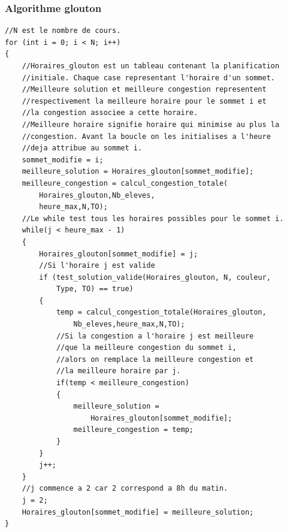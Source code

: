 \documentclass[a4paper,11pt]{article}
\begin{document}
		\subsubsection{Algorithme glouton}
\begin{lstlisting}
//N est le nombre de cours.
for (int i = 0; i < N; i++)
{
	//Horaires_glouton est un tableau contenant la planification 
	//initiale. Chaque case representant l'horaire d'un sommet.
	//Meilleure solution et meilleure congestion representent 
	//respectivement la meilleure horaire pour le sommet i et 
	//la congestion associee a cette horaire.
	//Meilleure horaire signifie horaire qui minimise au plus la 
	//congestion. Avant la boucle on les initialises a l'heure 
	//deja attribue au sommet i.
	sommet_modifie = i;
	meilleure_solution = Horaires_glouton[sommet_modifie];
	meilleure_congestion = calcul_congestion_totale(
		Horaires_glouton,Nb_eleves,
		heure_max,N,TO);
	//Le while test tous les horaires possibles pour le sommet i.
	while(j < heure_max - 1)
	{
		Horaires_glouton[sommet_modifie] = j;
		//Si l'horaire j est valide
		if (test_solution_valide(Horaires_glouton, N, couleur, 
			Type, TO) == true)
		{
			temp = calcul_congestion_totale(Horaires_glouton,
				Nb_eleves,heure_max,N,TO);
			//Si la congestion a l'horaire j est meilleure 
			//que la meilleure congestion du sommet i, 
			//alors on remplace la meilleure congestion et
			//la meilleure horaire par j.
			if(temp < meilleure_congestion)
			{
				meilleure_solution = 
					Horaires_glouton[sommet_modifie];
				meilleure_congestion = temp;
			}
		}
		j++;
	}
	//j commence a 2 car 2 correspond a 8h du matin.
	j = 2;
	Horaires_glouton[sommet_modifie] = meilleure_solution;
}
\end{lstlisting}
\end{document}
